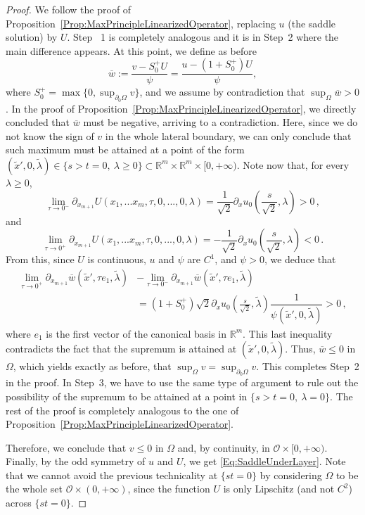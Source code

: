 \documentclass[12pt,reqno]{amsart}
\theoremstyle{definition}
\theoremstyle{remark}
\newcommand{\con}[1]{\mathbb{#1}}
\newcommand{\R}{\con{R}} %
\newcommand{\ocal}{\mathcal{O}}
\numberwithin{equation}{section}
\begin{document}
\begin{proof}
We follow the proof of Proposition~\ref{Prop:MaxPrincipleLinearizedOperator}, replacing $u$ (the saddle solution) by $U$. Step~ 1 is completely analogous and it is in Step~2 where the main difference appears. At this point, we define as before 
$$\overline{w} := \frac{v - S_0^+U}{\psi} = \frac{u - (1+S_0^+)U}{\psi},$$
where $S_0^+ = \max \{0, \sup_{\partial_0 \Omega} v\}$, and we assume by contradiction that $\sup_{\Omega} \overline{w}>0$. In the proof of Proposition~\ref{Prop:MaxPrincipleLinearizedOperator}, we directly concluded that $\overline{w}$ must be negative, arriving to a contradiction. Here, since we do not know the sign of $v$ in the whole lateral boundary, we can only conclude that such maximum must be attained at a point of the form $(\tilde{x}',0, \tilde{\lambda})\in \{s > t= 0,\ \lambda \geq 0\}\subset \R^m \times \R^m \times [0,+\infty)$. Note now that, for every $\lambda \geq 0$,
\begin{equation}
\label{Eq:ULipschitz1}
\lim_{\tau\to 0^-} \partial_{x_{m+1}}  U(x_1,...x_m,\tau,0,...,0,\lambda) = \frac{1}{\sqrt{2}}\partial_xu_0\left(\frac{s}{\sqrt{2}},\lambda\right)>0\,, 
\end{equation}
and
\begin{equation}
\label{Eq:ULipschitz2}
\lim_{\tau\to 0^+} \partial_{x_{m+1}} U(x_1,...x_m,\tau,0,...,0,\lambda) = -\frac{1}{\sqrt{2}}\partial_xu_0\left(\frac{s}{\sqrt{2}},\lambda\right) <0\,.
\end{equation}
From this, since $U$ is continuous, $u$ and $\psi$ are $C^1$, and $\psi > 0$, we deduce that
\begin{align*}
	\lim_{\tau\to 0^+} \partial_{x_{m+1}} \overline{w} (\tilde{x}',\tau e_1,\tilde{\lambda}) &- \lim_{\tau \to 0^-} \partial_{x_{m+1}} \overline{w} (\tilde{x}',\tau e_1,\tilde{\lambda}) \\
	&= (1+S_0^+) \sqrt{2} \partial_xu_0\left(\frac{s}{\sqrt{2}},\tilde{\lambda} \right) \dfrac{1}{\psi(\tilde{x}',0, \tilde{\lambda})}>0\,,  
\end{align*}
where $e_1$ is the first vector of the canonical basis in $\R^{m}$. This last inequality contradicts the fact that the supremum is attained at $(\tilde{x}',0, \tilde{\lambda})$. Thus, $\overline{w}\leq 0$ in $\Omega$, which yields exactly as before,  that $\sup _\Omega v = \sup_{\partial_0 \Omega} v$. This completes Step~2 in the proof. In Step~3, we have to use the same type of argument to rule out the possibility of the supremum to be attained at a point in $\{s > t = 0,\ \lambda = 0\}$. The rest of the proof is completely analogous to the one of Proposition~\ref{Prop:MaxPrincipleLinearizedOperator}.

Therefore, we conclude that $v\leq 0$ in $\Omega$ and, by continuity, in $\ocal\times[0,+\infty)$. Finally, by the odd symmetry of $u$ and $U$, we get \eqref{Eq:SaddleUnderLayer}. Note that we cannot avoid the previous technicality at $\{st=0\}$ by considering $\Omega$ to be the whole set $\ocal \times (0,+\infty)$, since the function $U$ is only Lipschitz (and not $C^2$) across $\{st=0\}$.
\end{proof}
\end{document}
